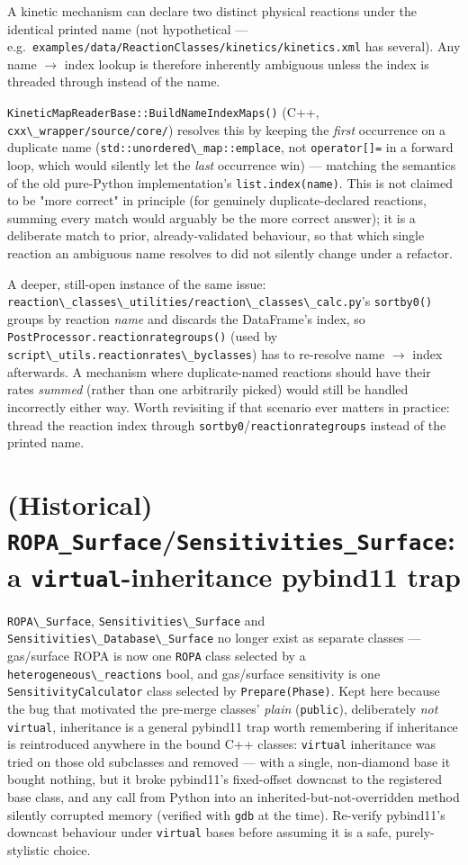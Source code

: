 \documentclass[11pt,a4paper]{report}
\newcommand{\pkg}[1]{\lstinline|#1|}
\begin{document}
A kinetic mechanism can declare two distinct physical reactions
under the identical printed name (not hypothetical --- e.g.\
\pkg{examples/data/ReactionClasses/kinetics/kinetics.xml} has several).
Any name $\to$ index lookup is therefore inherently ambiguous unless the
index is threaded through instead of the name.

\pkg{KineticMapReaderBase::BuildNameIndexMaps()} (C++,
\pkg{cxx\_wrapper/source/core/}) resolves this by keeping the
\emph{first} occurrence on a duplicate name (\pkg{std::unordered\_map::emplace},
not \pkg{operator[]=} in a forward loop, which would silently let the
\emph{last} occurrence win) --- matching the semantics of the old pure-Python
implementation's \pkg{list.index(name)}. This is not claimed to be "more
correct" in principle (for genuinely duplicate-declared reactions, summing
every match would arguably be the more correct answer); it is a deliberate
match to prior, already-validated behaviour, so that which single reaction
an ambiguous name resolves to did not silently change under a refactor.

A deeper, still-open instance of the same issue:
\pkg{reaction\_classes\_utilities/reaction\_classes\_calc.py}'s \pkg{sortby0()}
groups by reaction \emph{name} and discards the DataFrame's index, so
\pkg{PostProcessor.reactionrategroups()} (used by
\pkg{script\_utils.reactionrates\_byclasses}) has to re-resolve name
$\to$ index afterwards. A mechanism where duplicate-named reactions should
have their rates \emph{summed} (rather than one arbitrarily picked) would
still be handled incorrectly either way. Worth revisiting if that scenario
ever matters in practice: thread the reaction index through
\pkg{sortby0}/\pkg{reactionrategroups} instead of the printed name.

\section{(Historical) \texttt{ROPA\_Surface}/\texttt{Sensitivities\_Surface}: a \texttt{virtual}-inheritance pybind11 trap}

\pkg{ROPA\_Surface}, \pkg{Sensitivities\_Surface} and
\pkg{Sensitivities\_Database\_Surface} no longer exist as separate classes
--- gas/surface ROPA is now one \pkg{ROPA} class selected by a
\pkg{heterogeneous\_reactions} bool, and gas/surface sensitivity is one
\pkg{SensitivityCalculator} class selected by \pkg{Prepare(Phase)}. Kept
here because the bug that motivated the pre-merge classes' \emph{plain}
(\pkg{public}), deliberately \emph{not} \pkg{virtual}, inheritance is a
general pybind11 trap worth remembering if inheritance is reintroduced
anywhere in the bound C++ classes: \pkg{virtual} inheritance was tried on
those old subclasses and removed --- with a single, non-diamond base it
bought nothing, but it broke pybind11's fixed-offset downcast to the
registered base class, and any call from Python into an
inherited-but-not-overridden method silently corrupted memory (verified
with \pkg{gdb} at the time). Re-verify pybind11's downcast behaviour under
\pkg{virtual} bases before assuming it is a safe, purely-stylistic choice.
\end{document}
